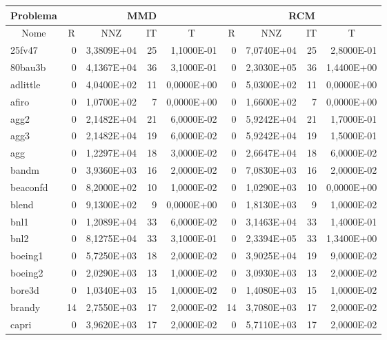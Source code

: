 \begin{tabular}{|l|r|r|r|r|r|r|r|r|}
\hline
\multicolumn{1}{|c|}{Problema} & \multicolumn{4}{|c|}{MMD} &         \multicolumn{4}{|c|}{RCM} \\ \hline
\multicolumn{1}{|c|}{Nome} & \multicolumn{1}{|c|}{R} &
        \multicolumn{1}{|c|}{NNZ} & \multicolumn{1}{|c|}{IT} &
        \multicolumn{1}{|c|}{T} & \multicolumn{1}{|c|}{R} &
        \multicolumn{1}{|c|}{NNZ} & \multicolumn{1}{|c|}{IT} &
        \multicolumn{1}{|c|}{T} \\ \hline
25fv47 & 0 & 3,3809E+04 & 25 & 1,1000E-01 & 0 & 7,0740E+04 & 25 & 2,8000E-01 \\ \hline
80bau3b & 0 & 4,1367E+04 & 36 & 3,1000E-01 & 0 & 2,3030E+05 & 36 & 1,4400E+00 \\ \hline
adlittle & 0 & 4,0400E+02 & 11 & 0,0000E+00 & 0 & 5,0300E+02 & 11 & 0,0000E+00 \\ \hline
afiro & 0 & 1,0700E+02 & 7 & 0,0000E+00 & 0 & 1,6600E+02 & 7 & 0,0000E+00 \\ \hline
agg2 & 0 & 2,1482E+04 & 21 & 6,0000E-02 & 0 & 5,9242E+04 & 21 & 1,7000E-01 \\ \hline
agg3 & 0 & 2,1482E+04 & 19 & 6,0000E-02 & 0 & 5,9242E+04 & 19 & 1,5000E-01 \\ \hline
agg & 0 & 1,2297E+04 & 18 & 3,0000E-02 & 0 & 2,6647E+04 & 18 & 6,0000E-02 \\ \hline
bandm & 0 & 3,9360E+03 & 16 & 2,0000E-02 & 0 & 7,0830E+03 & 16 & 2,0000E-02 \\ \hline
beaconfd & 0 & 8,2000E+02 & 10 & 1,0000E-02 & 0 & 1,0290E+03 & 10 & 0,0000E+00 \\ \hline
blend & 0 & 9,1300E+02 & 9 & 0,0000E+00 & 0 & 1,8130E+03 & 9 & 1,0000E-02 \\ \hline
bnl1 & 0 & 1,2089E+04 & 33 & 6,0000E-02 & 0 & 3,1463E+04 & 33 & 1,4000E-01 \\ \hline
bnl2 & 0 & 8,1275E+04 & 33 & 3,1000E-01 & 0 & 2,3394E+05 & 33 & 1,3400E+00 \\ \hline
boeing1 & 0 & 5,7250E+03 & 18 & 2,0000E-02 & 0 & 3,9025E+04 & 19 & 9,0000E-02 \\ \hline
boeing2 & 0 & 2,0290E+03 & 13 & 1,0000E-02 & 0 & 3,0930E+03 & 13 & 2,0000E-02 \\ \hline
bore3d & 0 & 1,0340E+03 & 15 & 1,0000E-02 & 0 & 1,4080E+03 & 15 & 1,0000E-02 \\ \hline
brandy & 14 & 2,7550E+03 & 17 & 2,0000E-02 & 14 & 3,7080E+03 & 17 & 2,0000E-02 \\ \hline
capri & 0 & 3,9620E+03 & 17 & 2,0000E-02 & 0 & 5,7110E+03 & 17 & 2,0000E-02 \\ \hline

\end{tabular}

